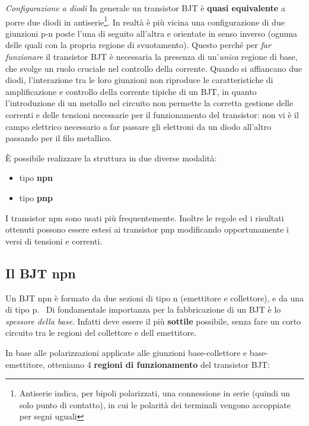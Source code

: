 \documentclass[
]{book}
\providecommand{\tightlist}{%
  \setlength{\itemsep}{0pt}\setlength{\parskip}{0pt}}
\begin{document}
\begin{redbox}{\emph{Configurazione a diodi}}
In generale un transistor BJT è \textbf{quasi equivalente }a porre due diodi in antiserie\footnote{Antiserie indica, per bipoli polarizzati, una connessione in serie (quindi un solo punto di contatto), in cui le polarità dei terminali vengono accoppiate per segni uguali}. In realtà è più vicina una configurazione di due giunzioni p-n poste l'una di seguito all'altra e orientate in senso inverso (ognuna delle quali con la propria regione di svuotamento). Questo perché per \emph{far funzionare} il transistor BJT è necessaria la presenza di un'\emph{unica} regione di base, che svolge un ruolo cruciale nel controllo della corrente. Quando si affiancano due diodi, l'interazione tra le loro giunzioni non riproduce le caratteristiche di amplificazione e controllo della corrente tipiche di un BJT, in quanto l'introduzione di un metallo nel circuito non permette la corretta gestione delle correnti e delle tensioni necessarie per il funzionamento del transistor: non vi è il campo elettrico necessario a far passare gli elettroni da un diodo all'altro passando per il filo metallico.
\end{redbox}

È possibile realizzare la struttura in due diverse modalità:

\begin{itemize}
\tightlist
\item
  tipo \textbf{npn}
\item
  tipo \textbf{pnp}
\end{itemize}

I transistor npn sono usati più frequentemente. Inoltre le regole ed i
risultati ottenuti possono essere estesi ai transistor pnp modificando
opportunamente i versi di tensioni e correnti.

\subsection{Il BJT npn}\label{il-bjt-npn}

Un BJT npn è formato da due sezioni di tipo n (emettitore e collettore),
e da una di tipo p.~ Di fondamentale importanza per la fabbricazione di
un BJT è lo \emph{spessore della base}. Infatti deve essere il più
\textbf{sottile} possibile, senza fare un corto circuito tra le regioni
del collettore e dell emettitore.

In base alle polarizzazioni applicate alle giunzioni base-collettore e
base-emettitore, otteniamo 4 \textbf{regioni di funzionamento} del
transistor BJT:
\end{document}
